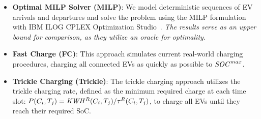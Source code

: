 %
\begin{itemize}[leftmargin=*]
    \item {\bf Optimal MILP Solver (MILP)}: We model deterministic sequences of EV arrivals and departures and solve the problem using the MILP formulation with IBM ILOG CPLEX Optimization Studio~\cite{cplex2009v12}. \textit{The results serve as an upper bound for comparison, as they utilize an oracle for optimality.}
    \item {\bf Fast Charge (FC)}: This approach simulates current real-world charging procedures, charging all connected EVs as quickly as possible to ${{\it SOC}^{max}}$.
    \item {\bf Trickle Charging (Trickle)}: The trickle charging approach utilizes the trickle charging rate, defined as the minimum required charge at each time slot: $P(C_i, T_j) = {\it KWH^{R}}(C_i, T_j)/\tau^R(C_i, T_j)$, to charge all EVs until they reach their required SoC. 

\end{itemize}
